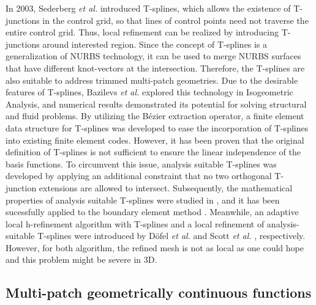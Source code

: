 \documentclass[preprint,12pt]{elsarticle}
\begin{document}
In 2003, Sederberg \textit{et al.} \cite{sederberg_t-splines_2003} introduced T-splines, which allows the existence of T-junctions in the control grid, so that lines of control points need not traverse the entire control grid. Thus, local refinement can be realized by introducing T-junctions around interested region. Since the concept of T-splines is a generalization of NURBS technology, it can be used to merge NURBS surfaces that have different knot-vectors at the intersection. Therefore, the T-splines are also suitable to address trimmed multi-patch geometries. Due to the desirable features of T-splines, Bazilevs \textit{et al.} \cite{bazilevs_isogeometric_2010} explored this technology in Isogeometric Analysis, and numerical results demonstrated its potential for solving structural and fluid problems. By utilizing the B\'ezier extraction operator, a finite element data structure for T-splines \cite{scott_isogeometric_2011} was developed to ease the incorporation of T-splines into existing finite element codes. However, it has been proven \cite{buffa_linear_2010} that the original definition of T-splines is not sufficient to ensure the linear independence of the basis functions. To circumvent this issue, analysis suitable T-splines \cite{li_linear_2012} was developed by applying an additional constraint that no two orthogonal T-junction extensions are allowed to intersect. Subsequently, the mathematical properties of analysis suitable T-splines were studied in \cite{li_analysis-suitable_2013,xin_li_properties_2015}, and it has been sucessfully applied to the boundary element method \cite{scott_isogeometric_2013}. Meanwhile, an adaptive local h-refinement algorithm with T-splines and a local refinement of analysis-suitable T-splines were introduced by D\"{o}fel \textit{et al.} \cite{dorfel_adaptive_2010} and Scott \textit{et al.} \cite{scott_local_2012}, respectively. However, for both algorithm, the refined mesh is not as local as one could hope and this problem might be severe in 3D.\par

\subsection{Multi-patch geometrically continuous functions}
\end{document}

